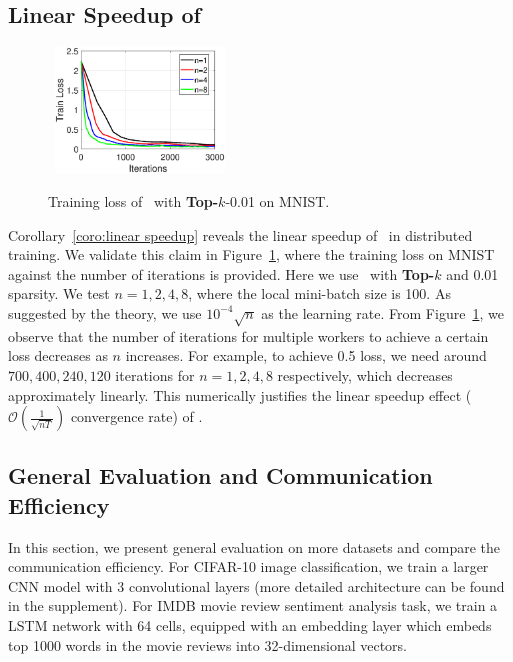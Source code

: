 \documentclass[11pt]{article}
\begin{document}
\subsection{Linear Speedup of \algo}

\begin{figure}
  \vspace{-0.35in}
  \begin{center}
   \mbox{\hspace{-0.05in}
    \includegraphics[width=0.4\textwidth]{fig/linear_speedup.eps}}
  \end{center}
  \vspace{-0.1in}
  \caption{Training loss of \algo\ with \textbf{Top-$k$}-0.01 on MNIST.}
  \label{fig:speedup}
\end{figure}

Corollary~\ref{coro:linear speedup} reveals the linear speedup of \algo\ in distributed training. We validate this claim in Figure~\ref{fig:speedup}, where the training loss on MNIST against the number of iterations is provided. Here we use \algo\ with \textbf{Top-$k$} and 0.01 sparsity. We test $n=1,2,4,8$, where the local mini-batch size is 100. As suggested by the theory, we use $10^{-4}\sqrt n$ as the learning rate. From Figure~\ref{fig:speedup}, we observe that the number of iterations for multiple workers to achieve a certain loss decreases as $n$ increases. For example, to achieve 0.5 loss, we need around $700,400,240,120$ iterations for $n=1,2,4,8$ respectively, which decreases approximately linearly. This numerically justifies the linear speedup effect ($\mathcal O(\frac{1}{\sqrt{nT}})$ convergence rate) of \algo.

\subsection{General Evaluation and Communication Efficiency}

In this section, we present general evaluation on more datasets and compare the communication efficiency. For CIFAR-10 image classification, we train a larger CNN model with 3 convolutional layers (more detailed architecture can be found in the supplement). For IMDB movie review sentiment analysis task, we train a LSTM network with 64 cells, equipped with an embedding layer which embeds top 1000 words in the movie reviews into 32-dimensional vectors.
\end{document}
